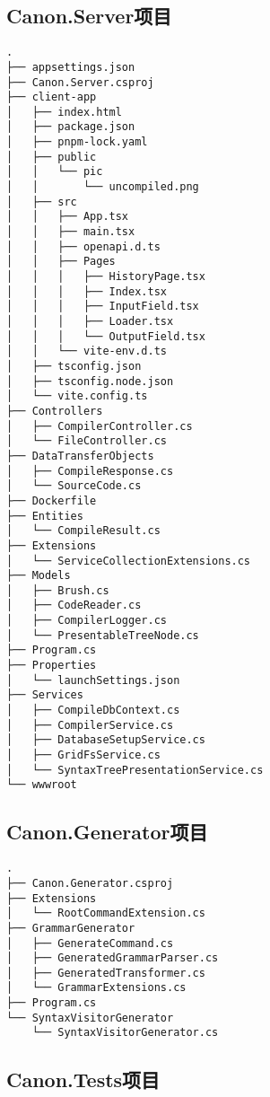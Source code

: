 \documentclass[../main.tex]{subfiles}
\begin{document}
\subsection{Canon.Server项目}

\begin{verbatim}
.
├── appsettings.json
├── Canon.Server.csproj
├── client-app
│   ├── index.html
│   ├── package.json
│   ├── pnpm-lock.yaml
│   ├── public
│   │   └── pic
│   │       └── uncompiled.png
│   ├── src
│   │   ├── App.tsx
│   │   ├── main.tsx
│   │   ├── openapi.d.ts
│   │   ├── Pages
│   │   │   ├── HistoryPage.tsx
│   │   │   ├── Index.tsx
│   │   │   ├── InputField.tsx
│   │   │   ├── Loader.tsx
│   │   │   └── OutputField.tsx
│   │   └── vite-env.d.ts
│   ├── tsconfig.json
│   ├── tsconfig.node.json
│   └── vite.config.ts
├── Controllers
│   ├── CompilerController.cs
│   └── FileController.cs
├── DataTransferObjects
│   ├── CompileResponse.cs
│   └── SourceCode.cs
├── Dockerfile
├── Entities
│   └── CompileResult.cs
├── Extensions
│   └── ServiceCollectionExtensions.cs
├── Models
│   ├── Brush.cs
│   ├── CodeReader.cs
│   ├── CompilerLogger.cs
│   └── PresentableTreeNode.cs
├── Program.cs
├── Properties
│   └── launchSettings.json
├── Services
│   ├── CompileDbContext.cs
│   ├── CompilerService.cs
│   ├── DatabaseSetupService.cs
│   ├── GridFsService.cs
│   └── SyntaxTreePresentationService.cs
└── wwwroot
\end{verbatim}

\subsection{Canon.Generator项目}

\begin{verbatim}
.
├── Canon.Generator.csproj
├── Extensions
│   └── RootCommandExtension.cs
├── GrammarGenerator
│   ├── GenerateCommand.cs
│   ├── GeneratedGrammarParser.cs
│   ├── GeneratedTransformer.cs
│   └── GrammarExtensions.cs
├── Program.cs
└── SyntaxVisitorGenerator
    └── SyntaxVisitorGenerator.cs
\end{verbatim}

\subsection{Canon.Tests项目}
\end{document}
